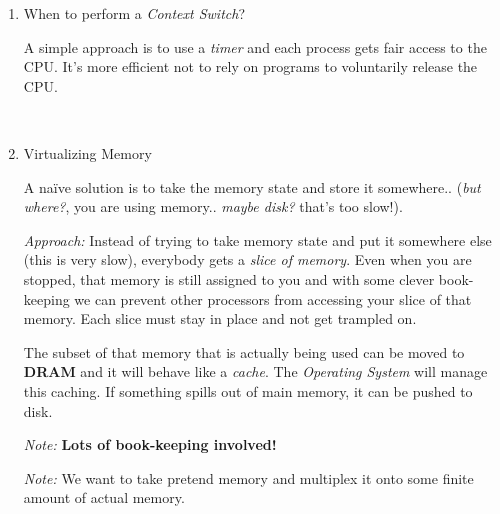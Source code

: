 \documentclass[12pt]{article}
\newenvironment{QandA}{\begin{enumerate}[label=\bfseries\arabic*.]\bfseries}
                      {\end{enumerate}}
\newenvironment{answered}{\par\quad\normalfont}{}
\begin{document}
\begin{QandA}
\begin{answered}
\quad This switching between applications is called \textbf{Context Switching}. 

\quad If \textbf{no state} is involved, this is pretty simple : just flush the pipeline and get rid of any instructions that were in the middle and then start up the new program. This isn't too expensive.

\quad When \textbf{state} is involved, it needs to be saved somewhere and then restored. For now, let's think of the state as the \textit{register files, registers, PC}. 
\end{answered}

\ 

\item When to perform a \textit{Context Switch}?
\begin{answered}
A simple approach is to use a \textit{timer} and each process gets fair access to the CPU. It's more efficient not to rely on programs to voluntarily release the CPU.
\end{answered}

\ 

\item Virtualizing Memory
\begin{answered}
A na\"ive solution is to take the memory state and store it somewhere.. (\textit{but where?}, you are using memory.. \textit{maybe disk?} that's too slow!). 

\textit{Approach:} Instead of trying to take memory state and put it somewhere else (this is very slow), everybody gets a \textit{slice of memory}. Even when you are stopped, that memory is still assigned to you and with some clever book-keeping we can prevent other processors from accessing your slice of that memory. Each slice must stay in place and not get trampled on. 

The subset of that memory that is actually being used can be moved to \textbf{DRAM} and it will behave like a \textit{cache}. The \textit{Operating System} will manage this caching. If something spills out of main memory, it can be pushed to disk. 

\textit{Note:} \textbf{Lots of book-keeping involved!}

\textit{Note:} We want to take pretend memory and multiplex it onto some finite amount of actual memory.
\end{answered}

\ 


\end{QandA}
\end{document}
